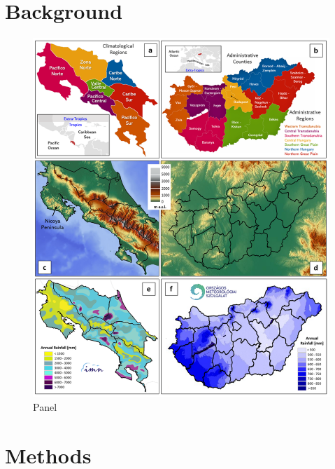 \documentclass[twocol]{ametsocV5} %
\begin{document}
\section{Background}
\begin{figure}
\centerline{\includegraphics[width=39pc]{manuscript/Figures/Background_Location_Orography_AnnualRainfall_H_CR.png}}
\caption{Panel }
\label{Location_Annual_Rainfall_H_CR}
\end{figure}


\section{Methods} 
\end{document}
